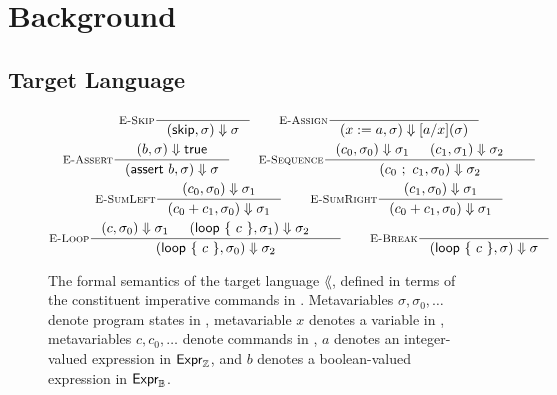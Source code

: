\documentclass[p.tex]{subfiles}
\begin{document}
\section{Background}\label{sec:background}

\subsection{Target Language}\label{sec:language}

\begin{figure}
\begin{spreadlines}{5pt}
\begin{gather*}
  \inference[\textsc{E-Skip}]{%
  }{%
    \ceval{\cskip}{\sigma}{\sigma}
  }
  \qquad
  \inference[\textsc{E-Assign}]{%
  }{%
    \ceval{\cassign{x}{a}}{\sigma}{\subst{x}{a}{(\sigma)}}
  }
  \\
  \inference[\textsc{E-Assert}]{%
    \eeval{b}{\sigma}{\btrue}
  }{%
    \ceval{\cassert{b}}{\sigma}{\sigma}
  }
  \qquad
  \inference[\textsc{E-Sequence}]{%
    \ceval{c_0}{\sigma_0}{\sigma_1}&
    \ceval{c_1}{\sigma_1}{\sigma_2}&
  }{%
    \ceval{\cseq{c_0}{c_1}}{\sigma_0}{\sigma_2}
  }
  \\
  \inference[\textsc{E-SumLeft}]{%
    \ceval{c_0}{\sigma_0}{\sigma_1}
  }{%
    \ceval{\csum{c_0}{c_1}}{\sigma_0}{\sigma_1}
  }
  \qquad
  \inference[\textsc{E-SumRight}]{%
    \ceval{c_1}{\sigma_0}{\sigma_1}
  }{%
    \ceval{\csum{c_0}{c_1}}{\sigma_0}{\sigma_1}
  }
  \\
  \inference[\textsc{E-Loop}]{%
    \ceval{c}{\sigma_0}{\sigma_1}&
    \ceval{\cloop{c}}{\sigma_1}{\sigma_2}&
  }{%
    \ceval{\cloop{c}}{\sigma_0}{\sigma_2}
  }
  \qquad
  \inference[\textsc{E-Break}]{%
  }{%
    \ceval{\cloop{c}}{\sigma}{\sigma}
  }
\end{gather*}
\end{spreadlines}
  \caption{%
    The formal semantics of the target language $\lang$, defined in
    terms of the constituent imperative commands in \com.
    Metavariables $\sigma, \sigma_0, \ldots$ denote program states in
    \state, metavariable $x$ denotes a variable in \var, metavariables
    $c, c_0, \ldots$ denote commands in \com, $a$ denotes an
    integer-valued expression in $\textsf{Expr}_{\mathbb{Z}}$, and $b$ denotes a
    boolean-valued expression in $\textsf{Expr}_{\mathbb{B}}$.
  }\label{fig:semantics}
\end{figure}
\end{document}
